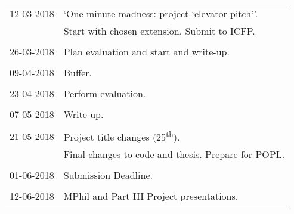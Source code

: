 \documentclass[11pt]{article}
\begin{document}
\begin{table}[H]
\begin{tabular}{ll}
    12-03-2018 & `One-minute madness: project `elevator pitch''.               \\
               &  Start with chosen extension. Submit to ICFP.                 \\
                                                                               \\

    26-03-2018 & Plan evaluation and start and write-up.                       \\
                                                                               \\

    09-04-2018 & Buffer.                                                       \\
                                                                               \\

    23-04-2018 & Perform evaluation.                                           \\
                                                                               \\

    07-05-2018 & Write-up.                                                     \\
                                                                               \\

    21-05-2018 & Project title changes (25\textsuperscript{th}).               \\
               & Final changes to code and thesis. Prepare for POPL.           \\
                                                                               \\

    01-06-2018 & Submission Deadline.                                          \\
                                                                               \\

    12-06-2018 & MPhil and Part III Project presentations.                     \\
                                                                               \\

  \bottomrule

\end{tabular}
\end{table}
\vspace*{\fill}
\newpage


\end{document}
